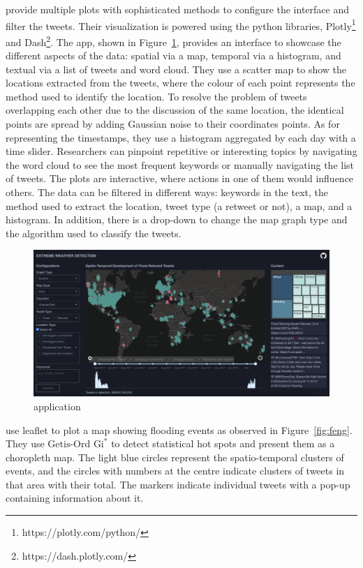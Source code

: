  provide multiple plots with sophisticated
methods to configure the interface and filter the tweets. Their visualization is powered using the python
libraries, Plotly\footnote{https://plotly.com/python/} and Dash\footnote{https://dash.plotly.com/}.
The app, shown in Figure~\ref{fig:peter}, provides an interface to showcase the different aspects of the
data: spatial via a map, temporal via a histogram, and textual via a list of tweets and word cloud.
They use a scatter map to show the locations extracted from the tweets, where the colour of each
point represents the method used to identify the location. To resolve the problem of tweets
overlapping each other due to the discussion of the same location, the identical points are
spread by adding Gaussian noise to their coordinates points. As for representing the timestamps,
they use a histogram aggregated by each day with a time slider. Researchers can pinpoint repetitive
or interesting topics by navigating the word cloud to see the most frequent keywords or manually
navigating the list of tweets. The plots are interactive, where actions in one of them would
influence others. The data can be filtered in different ways: keywords in the text, the method used
to extract the location, tweet type (a retweet or not), a map, and a histogram. In addition, there is a
drop-down to change the map graph type and the algorithm used to classify the tweets.

\begin{figure}[H]
\begin{center}
  \includegraphics[width=\columnwidth]{./images/peter.png}
\end{center}
\caption{ application}
\label{fig:peter}
\end{figure}

 use leaflet to plot a map showing flooding events as
observed in Figure~\ref{fig:feng}. They use $\text{Getis-Ord Gi}^{\ast}$ \cite{ordLocalSpatialAutocorrelation2010}
to detect statistical hot spots and present them as a choropleth map. The light blue circles
represent the spatio-temporal clusters of events, and the circles with numbers at the centre
indicate clusters of tweets in that area with their total. The markers indicate individual tweets
with a pop-up containing information about it.

